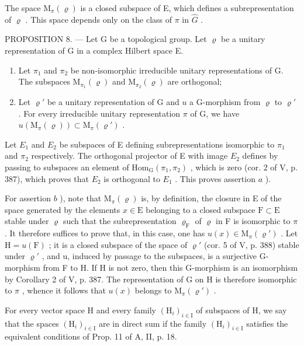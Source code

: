 The space \(\mathrm{M}_{\pi}(\varrho)\) is a closed subspace of E, which defines a subrepresentation of \(\varrho\) . This space depends only on the class of \(\pi\) in \(\widehat{G}\) .

PROPOSITION 8. — Let G be a topological group. Let \(\varrho\) be a unitary representation of G in a complex Hilbert space E.

\begin{enumerate}
\def\labelenumi{\alph{enumi})}
\item
  Let \(\pi_1\) and \(\pi_2\) be non-isomorphic irreducible unitary representations of G. The subspaces \(\mathrm{M}_{\pi_1}(\varrho)\) and \(\mathrm{M}_{\pi_2}(\varrho)\) are orthogonal;
\item
  Let \(\varrho'\) be a unitary representation of G and \(u\) a G-morphism from \(\varrho\) to \(\varrho'\) . For every irreducible unitary representation \(\pi\) of G, we have \(u(\mathrm{M}_{\pi}(\varrho)) \subset \mathrm{M}_{\pi}(\varrho')\) .
\end{enumerate}

Let \(E_{1}\) and \(E_{2}\) be subspaces of E defining subrepresentations isomorphic to \(\pi_{1}\) and \(\pi_{2}\) respectively. The orthogonal projector of E with image \(E_{2}\) defines by passing to subspaces an element of \(\mathrm{Hom}_{\mathrm{G}}(\pi_{1},\pi_{2})\) , which is zero (cor. 2 of V, p. 387), which proves that \(E_{2}\) is orthogonal to \(E_{1}\) . This proves assertion \(a\) ).

For assertion \(b\) ), note that \(\mathrm{M}_{\pi}(\varrho)\) is, by definition, the closure in E of the space generated by the elements \(x \in \mathrm{E}\) belonging to a closed subspace \(\mathrm{F} \subset \mathrm{E}\) stable under \(\varrho\) such that the subrepresentation \(\varrho_{\mathrm{F}}\) of \(\varrho\) in F is isomorphic to \(\pi\) . It therefore suffices to prove that, in this case, one has \(u(x) \in \mathrm{M}_{\pi}(\varrho')\) . Let \(\mathrm{H} = u(\mathrm{F})\) ; it is a closed subspace of the space of \(\varrho'\) (cor. 5 of V, p. 388) stable under \(\varrho'\) , and u, induced by passage to the subspaces, is a surjective G-morphism from F to H. If H is not zero, then this G-morphism is an isomorphism by Corollary 2 of V, p. 387. The representation of G on H is therefore isomorphic to \(\pi\) , whence it follows that \(u(x)\) belongs to \(\mathrm{M}_{\pi}(\varrho')\) .

For every vector space H and every family \((\mathrm{H}_{i})_{i\in\mathrm{I}}\) of subspaces of H, we say that the spaces \((\mathrm{H}_{i})_{i\in\mathrm{I}}\) are in direct sum if the family \((\mathrm{H}_{i})_{i\in\mathrm{I}}\) satisfies the equivalent conditions of Prop. 11 of A, II, p. 18.

